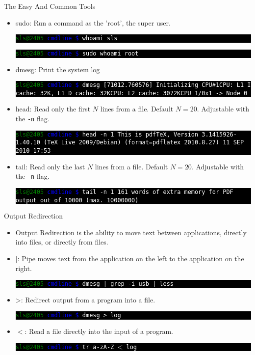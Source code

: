 \documentclass[10pt]{beamer}
\makeatletter
\newcommand{\codeblock}[1]
{
  \colorbox{black}{
    \begin{minipage}{\linewidth}
      \texttt{\textcolor{green}{sls@2405} \textcolor{blue}{cmdline \$} \textcolor{white}{#1}}
    \end{minipage}
  }
}
\newcommand{\codeblockWO}[2]
{
  \colorbox{black}{
    \begin{minipage}{\linewidth}
      \texttt{\textcolor{green}{sls@2405} \textcolor{blue}{cmdline \$} \textcolor{white}{#1}
      \newline
      \textcolor{white}{#2}}
    \end{minipage}
  }
}
\makeatother
\begin{document}
\begin{frame}[allowframebreaks]{The Easy And Common Tools}
\begin{itemize}
\item sudo: Run a command as the 'root', the super user.
\codeblockWO{whoami}{sls}
\codeblockWO{sudo whoami}{root}

\item dmesg: Print the system log
\codeblockWO{dmesg}{[71012.760576] Initializing CPU\#1\newline
[71012.760576] CPU: L1 I cache: 32K, L1 D cache: 32K\newline
[71012.760576] CPU: L2 cache: 3072K\newline
[71012.760576] CPU 1/0x1 -> Node 0}

\item head: Read only the first $N$ lines from a file. Default $N=20$. Adjustable with the \texttt{-n} flag.
\codeblockWO{head -n 1}{This is pdfTeX, Version 3.1415926-1.40.10 (TeX Live 2009/Debian) (format=pdflatex 2010.8.27)  11 SEP 2010 17:53}

\item tail: Read only the last $N$ lines from a file. Default $N=20$. Adjustable with the \texttt{-n} flag.
\codeblockWO{tail -n 1}{161 words of extra memory for PDF output out of 10000 (max. 10000000)}

\end{itemize}
\end{frame}

\begin{frame}{Output Redirection}
\begin{itemize}
\item Output Redirection is the ability to move text between applications, directly into files, or directly from files.

\item |: Pipe moves text from the application on the left to the application on the right.
\codeblock{dmesg | grep -i usb | less}

\item >: Redirect output from a program into a file.
\codeblock{dmesg > log}

\item $<$: Read a file directly into the input of a program.
\codeblock{tr a-zA-Z $\texttt{<}$ log}
\end{itemize}
\end{frame}
\end{document}
